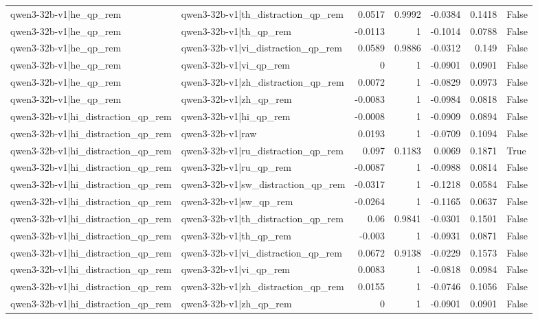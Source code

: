 \begin{table}
\begin{tabular}{l l r r r r l}
qwen3-32b-v1|he_qp_rem & qwen3-32b-v1|th_distraction_qp_rem & 0.0517 & 0.9992 & -0.0384 & 0.1418 & False \\
qwen3-32b-v1|he_qp_rem & qwen3-32b-v1|th_qp_rem & -0.0113 & 1 & -0.1014 & 0.0788 & False \\
qwen3-32b-v1|he_qp_rem & qwen3-32b-v1|vi_distraction_qp_rem & 0.0589 & 0.9886 & -0.0312 & 0.149 & False \\
qwen3-32b-v1|he_qp_rem & qwen3-32b-v1|vi_qp_rem & 0 & 1 & -0.0901 & 0.0901 & False \\
qwen3-32b-v1|he_qp_rem & qwen3-32b-v1|zh_distraction_qp_rem & 0.0072 & 1 & -0.0829 & 0.0973 & False \\
qwen3-32b-v1|he_qp_rem & qwen3-32b-v1|zh_qp_rem & -0.0083 & 1 & -0.0984 & 0.0818 & False \\
qwen3-32b-v1|hi_distraction_qp_rem & qwen3-32b-v1|hi_qp_rem & -0.0008 & 1 & -0.0909 & 0.0894 & False \\
qwen3-32b-v1|hi_distraction_qp_rem & qwen3-32b-v1|raw & 0.0193 & 1 & -0.0709 & 0.1094 & False \\
qwen3-32b-v1|hi_distraction_qp_rem & qwen3-32b-v1|ru_distraction_qp_rem & 0.097 & 0.1183 & 0.0069 & 0.1871 & True \\
qwen3-32b-v1|hi_distraction_qp_rem & qwen3-32b-v1|ru_qp_rem & -0.0087 & 1 & -0.0988 & 0.0814 & False \\
qwen3-32b-v1|hi_distraction_qp_rem & qwen3-32b-v1|sw_distraction_qp_rem & -0.0317 & 1 & -0.1218 & 0.0584 & False \\
qwen3-32b-v1|hi_distraction_qp_rem & qwen3-32b-v1|sw_qp_rem & -0.0264 & 1 & -0.1165 & 0.0637 & False \\
qwen3-32b-v1|hi_distraction_qp_rem & qwen3-32b-v1|th_distraction_qp_rem & 0.06 & 0.9841 & -0.0301 & 0.1501 & False \\
qwen3-32b-v1|hi_distraction_qp_rem & qwen3-32b-v1|th_qp_rem & -0.003 & 1 & -0.0931 & 0.0871 & False \\
qwen3-32b-v1|hi_distraction_qp_rem & qwen3-32b-v1|vi_distraction_qp_rem & 0.0672 & 0.9138 & -0.0229 & 0.1573 & False \\
qwen3-32b-v1|hi_distraction_qp_rem & qwen3-32b-v1|vi_qp_rem & 0.0083 & 1 & -0.0818 & 0.0984 & False \\
qwen3-32b-v1|hi_distraction_qp_rem & qwen3-32b-v1|zh_distraction_qp_rem & 0.0155 & 1 & -0.0746 & 0.1056 & False \\
qwen3-32b-v1|hi_distraction_qp_rem & qwen3-32b-v1|zh_qp_rem & 0 & 1 & -0.0901 & 0.0901 & False \\

\end{tabular}
\end{table}
